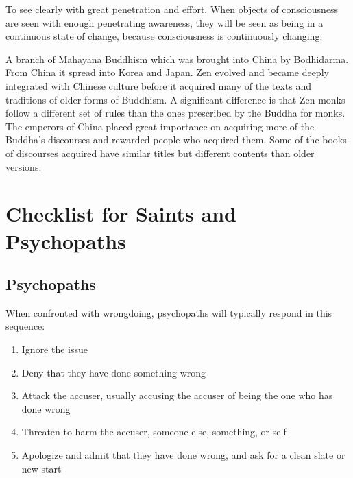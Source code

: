 \documentclass[a5paper,10pt,english]{book}
\begin{document}
\begin{description}
\sphinxAtStartPar
To see clearly with great penetration and effort. When
objects of consciousness are seen with enough penetrating awareness,
they will be seen as being in a continuous state of change, because
consciousness is continuously changing.

\sphinxAtStartPar
A branch of Mahayana Buddhism which was brought into China by
Bodhidarma. From China it spread into Korea and Japan. Zen evolved and
became deeply integrated with Chinese culture before it acquired many of
the texts and traditions of older forms of Buddhism. A significant
difference is that Zen monks follow a different set of rules than the
ones prescribed by the Buddha for monks. The emperors of China placed
great importance on acquiring more of the Buddha’s discourses and
rewarded people who acquired them. Some of the books of discourses
acquired have similar titles but different contents than older versions.

\end{description}

\sphinxstepscope


\chapter{Checklist for Saints and Psychopaths}
\label{\detokenize{checklist:checklist-for-saints-and-psychopaths}}\label{\detokenize{checklist::doc}}

\section{Psychopaths}
\label{\detokenize{checklist:psychopaths}}
\sphinxAtStartPar
When confronted with wrong\sphinxhyphen{}doing, psychopaths will typically respond in this sequence:
\begin{enumerate}
%
\item {} 
\sphinxAtStartPar
Ignore the issue

\item {} 
\sphinxAtStartPar
Deny that they have done something wrong

\item {} 
\sphinxAtStartPar
Attack the accuser, usually accusing the accuser of being the one who has done wrong

\item {} 
\sphinxAtStartPar
Threaten to harm the accuser, someone else, something, or self

\item {} 
\sphinxAtStartPar
Apologize and admit that they have done wrong, and ask for a clean slate or new start

\end{enumerate}
\end{document}

